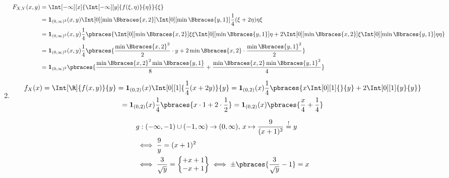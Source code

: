 \begin{solution}
\begin{enumerate}[label = (\alph*)]
    \begin{align*}
        F_{X, Y}(x, y)
        & =
        \Int[-\infty][x]
        {
            \Int[-\infty][y]
            {
                f(\xi, \eta)
            }{\eta}
        }{\xi} \\
        & =
        \mathbf 1_{(0, \infty)^2}(x, y)
        \Int[0][\min \Bbraces{x, 2}]
        {
            \Int[0][\min \Bbraces{y, 1}]
            {
                \frac{1}{4}
                (\xi + 2 \eta)
            }{\eta}
        }{\xi} \\
        & =
        \mathbf 1_{(0, \infty)^2}(x, y)
        \frac{1}{4}
        \pbraces
        {
            \Int[0][\min \Bbraces{x, 2}]{\xi}{\xi}
            \Int[0][\min \Bbraces{y, 1}]{}{\eta}
            +
            2
            \Int[0][\min \Bbraces{x, 2}]{}{\xi}
            \Int[0][\min \Bbraces{y, 1}]{\eta}{\eta}
        } \\
        & =
        \mathbf 1_{(0, \infty)^2}(x, y)
        \frac{1}{4}
        \pbraces
        {
            \frac{\min \Bbraces{x, 2}^2}{2} \cdot y
            +
            2 \min \Bbraces{x, 2} \cdot \frac{\min \Bbraces{y, 1}^2}{2}
        } \\
        & =
        \mathbf 1_{(0, \infty)^2}
        \pbraces
        {
            \frac{\min \Bbraces{x, 2}^2 \min \Bbraces{y, 1}}{8}
            +
            \frac{\min \Bbraces{x, 2} \min \Bbraces{y, 1}^2}{4}
        }
    \end{align*}

    \item

    \begin{multline*}
        f_X(x)
        =
        \Int[\R]{f(x, y)}{y}
        =
        \mathbf 1_{(0, 2)}(x) \Int[0][1]{\frac{1}{4} (x + 2 y)}{y}
        =
        \mathbf 1_{(0, 2)}(x)
        \frac{1}{4}
        \pbraces
        {
            x \Int[0][1]{}{y}
            +
            2 \Int[0][1]{y}{y}
        } \\
        =
        \mathbf 1_{(0, 2)}(x) \frac{1}{4} \pbraces{x \cdot 1 + 2 \cdot \frac{1}{2}}
        =
        \mathbf 1_{(0, 2)}(x)
        \pbraces
        {
            \frac{x}{4}
            +
            \frac{1}{4}
        }
    \end{multline*}

    \begin{align*}
        &
        g:
            (-\infty, -1) \cup (-1, \infty) \to (0, \infty), \,
            x \mapsto \frac{9}{(x + 1)^2} \stackrel{!}{=} y \\
        & \iff
        \frac{9}{y} = (x + 1)^2 \\
        & \iff
        \frac{3}{\sqrt y}
        =
        \begin{Bmatrix}
            +x + 1 \\
            -x + 1
        \end{Bmatrix}
        \iff
        \pm \pbraces{\frac{3}{\sqrt y} - 1} = x
    \end{align*}


\end{enumerate}
\end{solution}
